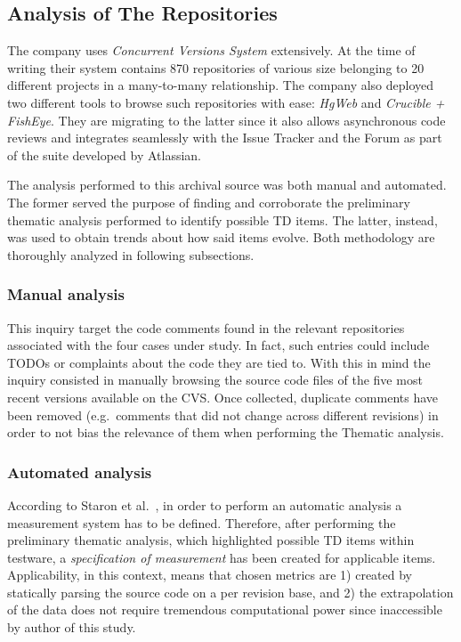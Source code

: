 \subsection{Analysis of The Repositories} \label{sec:analysis_of_the_repos}
The company uses \textit{Concurrent Versions System} extensively. At the time of writing their system contains 870 repositories of various size belonging to 20 different projects in a many-to-many relationship. The company also deployed two different tools to browse such repositories with ease: \textit{HgWeb} and \textit{Crucible + FishEye}. They are migrating to the latter since it also allows asynchronous code reviews and integrates seamlessly with the Issue Tracker and the Forum as part of the suite developed by Atlassian.

The analysis performed to this archival source was both manual and automated. The former served the purpose of finding and corroborate the preliminary thematic analysis performed to identify possible TD items. The latter, instead, was used to obtain trends about how said items evolve. Both methodology are thoroughly analyzed in following subsections.

\subsubsection{Manual analysis}
    This inquiry target the code comments found in the relevant repositories associated with the four cases under study. In fact, such entries could include TODOs or complaints about the code they are tied to. With this in mind the inquiry consisted in manually browsing the source code files of the five most recent versions available on the CVS. Once collected, duplicate comments have been removed (e.g.\ comments that did not change across different revisions) in order to not bias the relevance of them when performing the Thematic analysis.


\subsubsection{Automated analysis} \label{sec:automated_analysis}
    According to Staron et al.\ \cite{metrics_paper}, in order to perform an automatic analysis a measurement system has to be defined. Therefore, after performing the preliminary thematic analysis, which highlighted possible TD items within testware, a \textit{specification of measurement} has been created for applicable items. Applicability, in this context, means that chosen metrics are 1) created by statically parsing the source code on a per revision base, and 2) the extrapolation of the data does not require tremendous computational power since inaccessible by author of this study.

